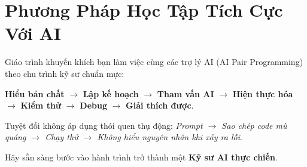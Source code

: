 \section*{Phương Pháp Học Tập Tích Cực Với AI}

Giáo trình khuyến khích bạn làm việc cùng các trợ lý AI (AI Pair Programming) theo chu trình kỹ sư chuẩn mực:
\begin{center}
\textbf{Hiểu bản chất} $\rightarrow$ \textbf{Lập kế hoạch} $\rightarrow$ \textbf{Tham vấn AI} $\rightarrow$ \textbf{Hiện thực hóa} $\rightarrow$ \textbf{Kiểm thử} $\rightarrow$ \textbf{Debug} $\rightarrow$ \textbf{Giải thích được}.
\end{center}

Tuyệt đối không áp dụng thói quen thụ động: \textit{Prompt $\rightarrow$ Sao chép code mù quáng $\rightarrow$ Chạy thử $\rightarrow$ Không hiểu nguyên nhân khi xảy ra lỗi}.

Hãy sẵn sàng bước vào hành trình trở thành một \textbf{Kỹ sư AI thực chiến}.
